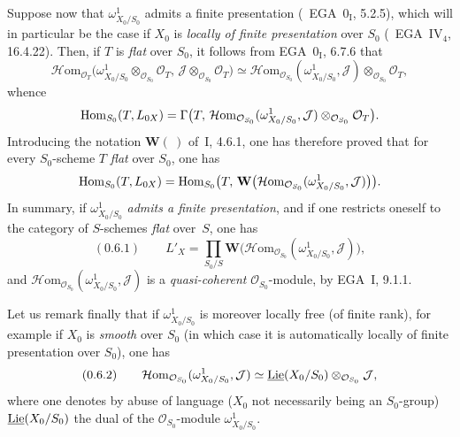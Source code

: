 Suppose now that \(\omega^{1}_{X_{0}/S_{0}}\) admits a finite presentation
(\cf\ EGA~\(0_{\mathrm{I}}\), 5.2.5), which will in particular be the case if
\(X_{0}\) is \emph{locally of finite presentation} over \(S_{0}\)
(\cf\ EGA~IV\(_4\), 16.4.22). Then, if \(T\) is \emph{flat} over \(S_{0}\), it
follows from EGA~\(0_{\mathrm{I}}\), 6.7.6 that
\[
\mathcal{H}\mathrm{om}_{\mathcal{O}_{T}}
  \bigl(\omega^{1}_{X_{0}/S_{0}}\otimes_{\mathcal{O}_{S_{0}}}\mathcal{O}_{T},\,
  \mathcal{J}\otimes_{\mathcal{O}_{S_{0}}}\mathcal{O}_{T}\bigr)
\simeq
\mathcal{H}\mathrm{om}_{\mathcal{O}_{S_{0}}}
  (\omega^{1}_{X_{0}/S_{0}},\mathcal{J})
  \otimes_{\mathcal{O}_{S_{0}}}\mathcal{O}_{T},
\]
whence
\[
\operatorname{Hom}_{S_{0}}(T,L_{0X})
=
\Gamma\bigl(T,\,
  \mathcal{H}\mathrm{om}_{\mathcal{O}_{S_{0}}}
    (\omega^{1}_{X_{0}/S_{0}},\mathcal{J})
    \otimes_{\mathcal{O}_{S_{0}}}\mathcal{O}_{T}\bigr).
\]
Introducing the notation \(\mathbf{W}(\ )\) of~I, 4.6.1, one has therefore proved
that for every \(S_{0}\)-scheme \(T\) \emph{flat} over \(S_{0}\), one has
\[
\operatorname{Hom}_{S_{0}}(T,L_{0X})
=
\operatorname{Hom}_{S_{0}}\bigl(T,\,
  \mathbf{W}\bigl(\mathcal{H}\mathrm{om}_{\mathcal{O}_{S_{0}}}
    (\omega^{1}_{X_{0}/S_{0}},\mathcal{J})\bigr)\bigr).
\]
In summary, if \(\omega^{1}_{X_{0}/S_{0}}\) \emph{admits a finite presentation},
and if one restricts oneself to the category of \(S\)-schemes \emph{flat}
over~\(S\), one has
\begin{equation*}
(0.6.1)\qquad
L'_{X}
=
\prod_{S_{0}/S}
  \mathbf{W}\bigl(\mathcal{H}\mathrm{om}_{\mathcal{O}_{S_{0}}}
    (\omega^{1}_{X_{0}/S_{0}},\mathcal{J})\bigr),
\end{equation*}
and \(\mathcal{H}\mathrm{om}_{\mathcal{O}_{S_{0}}}
(\omega^{1}_{X_{0}/S_{0}},\mathcal{J})\) is a \emph{quasi-coherent}
\(\mathcal{O}_{S_{0}}\)-module, by EGA~I, 9.1.1.

Let us remark finally that if \(\omega^{1}_{X_{0}/S_{0}}\) is moreover locally
free (of finite rank), for example if \(X_{0}\) is \emph{smooth} over \(S_{0}\)
(in which case it is automatically locally of finite presentation over
\(S_{0}\)), one has
\begin{equation*}
(0.6.2)\qquad
\mathcal{H}\mathrm{om}_{\mathcal{O}_{S_{0}}}
  (\omega^{1}_{X_{0}/S_{0}},\mathcal{J})
\simeq
\underline{\operatorname{Lie}}(X_{0}/S_{0})\otimes_{\mathcal{O}_{S_{0}}}\mathcal{J},
\end{equation*}
where one denotes by abuse of language (\(X_{0}\) not necessarily being an
\(S_{0}\)-group) \(\underline{\operatorname{Lie}}(X_{0}/S_{0})\) the dual of the
\(\mathcal{O}_{S_{0}}\)-module \(\omega^{1}_{X_{0}/S_{0}}\).%
{\renewcommand{\thefootnote}{(23)}}

